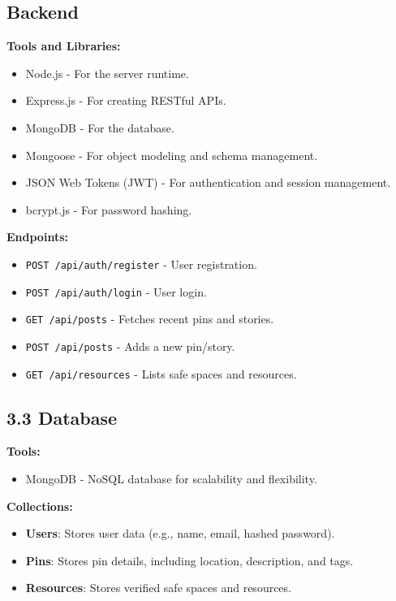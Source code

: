 \documentclass{article}
\begin{document}
\subsection{Backend}
\textbf{Tools and Libraries:}
\begin{itemize}
    \item Node.js - For the server runtime.
    \item Express.js - For creating RESTful APIs.
    \item MongoDB - For the database.
    \item Mongoose - For object modeling and schema management.
    \item JSON Web Tokens (JWT) - For authentication and session management.
    \item bcrypt.js - For password hashing.
\end{itemize}

\textbf{Endpoints:}
\begin{itemize}
    \item \texttt{POST /api/auth/register} - User registration.
    \item \texttt{POST /api/auth/login} - User login.
    \item \texttt{GET /api/posts} - Fetches recent pins and stories.
    \item \texttt{POST /api/posts} - Adds a new pin/story.
    \item \texttt{GET /api/resources} - Lists safe spaces and resources.
\end{itemize}

\subsection{3.3 Database}
\textbf{Tools:}
\begin{itemize}
    \item MongoDB - NoSQL database for scalability and flexibility.
\end{itemize}

\textbf{Collections:}
\begin{itemize}
    \item \textbf{Users}: Stores user data (e.g., name, email, hashed password).
    \item \textbf{Pins}: Stores pin details, including location, description, and tags.
    \item \textbf{Resources}: Stores verified safe spaces and resources.
\end{itemize}
\end{document}
